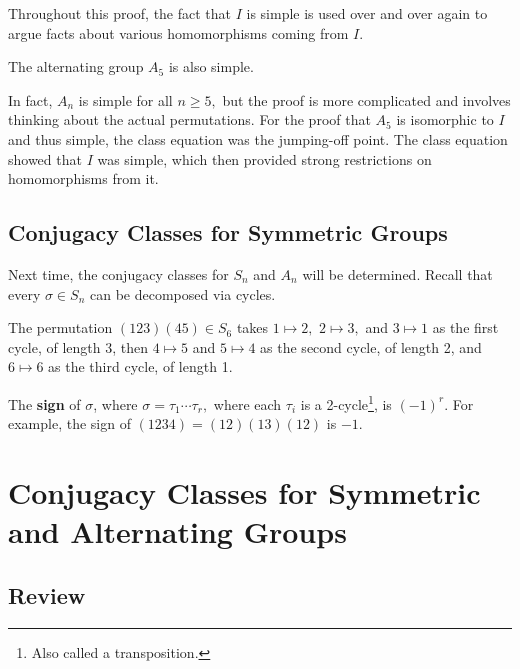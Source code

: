 Throughout this proof, the fact that $I$ is simple is used over and over again to argue facts about various homomorphisms coming from $I.$

\begin{corollary}
The alternating group $A_5$ is also simple.
\end{corollary}

In fact, $A_n$ is simple for all $n \geq 5,$ but the proof is more complicated and involves thinking about the actual permutations. For the proof that $A_5$ is isomorphic to $I$ and thus simple, the class equation was the jumping-off point. The class equation showed that $I$ was simple, which then provided strong restrictions on homomorphisms from it. 

\subsection{Conjugacy Classes for Symmetric Groups}

Next time, the conjugacy classes for $S_n$ and $A_n$ will be determined. Recall that every $\sigma \in S_n$ can be decomposed via cycles. 
\begin{example}
The permutation $(123)(45) \in S_6$ takes $1 \mapsto 2,$ $2 \mapsto 3,$ and $3 \mapsto 1$ as the first cycle, of length 3, then $4 \mapsto 5$ and $5 \mapsto 4$ as the second cycle, of length 2, and $6 \mapsto 6$ as the third cycle, of length 1. 
\end{example}

The \textbf{sign} of $\sigma$, where $\sigma = \tau_1 \cdots \tau_r,$ where each $\tau_i$ is a 2-cycle\footnote{Also called a transposition.}, is $(-1)^r.$ For example, the sign of $(1234) = (12)(13)(12)$ is $-1.$ 

\newpage


\section{Conjugacy Classes for Symmetric and Alternating Groups}

\subsection{Review}

